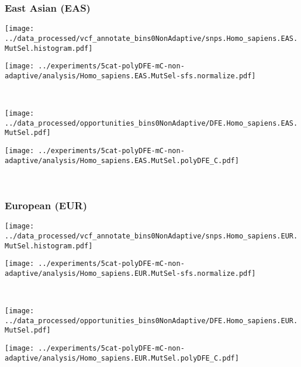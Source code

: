 \subsubsection{East Asian (EAS)}

\begin{minipage}{0.49\linewidth}
    \texttt{[image: ../data\_processed/vcf\_annotate\_bins0NonAdaptive/snps.Homo\_sapiens.EAS.MutSel.histogram.pdf]}
\end{minipage}
\begin{minipage}{0.49\linewidth}
    \texttt{[image: ../experiments/5cat-polyDFE-mC-non-adaptive/analysis/Homo\_sapiens.EAS.MutSel-sfs.normalize.pdf]}
\end{minipage}
\\
\begin{minipage}{0.49\linewidth}
    \texttt{[image: ../data\_processed/opportunities\_bins0NonAdaptive/DFE.Homo\_sapiens.EAS.MutSel.pdf]}
\end{minipage}
\begin{minipage}{0.49\linewidth}
    \texttt{[image: ../experiments/5cat-polyDFE-mC-non-adaptive/analysis/Homo\_sapiens.EAS.MutSel.polyDFE\_C.pdf]}
\end{minipage}
\\

\subsubsection{European (EUR)}

\begin{minipage}{0.49\linewidth}
    \texttt{[image: ../data\_processed/vcf\_annotate\_bins0NonAdaptive/snps.Homo\_sapiens.EUR.MutSel.histogram.pdf]}
\end{minipage}
\begin{minipage}{0.49\linewidth}
    \texttt{[image: ../experiments/5cat-polyDFE-mC-non-adaptive/analysis/Homo\_sapiens.EUR.MutSel-sfs.normalize.pdf]}
\end{minipage}
\\
\begin{minipage}{0.49\linewidth}
    \texttt{[image: ../data\_processed/opportunities\_bins0NonAdaptive/DFE.Homo\_sapiens.EUR.MutSel.pdf]}
\end{minipage}
\begin{minipage}{0.49\linewidth}
    \texttt{[image: ../experiments/5cat-polyDFE-mC-non-adaptive/analysis/Homo\_sapiens.EUR.MutSel.polyDFE\_C.pdf]}
\end{minipage}
\\


